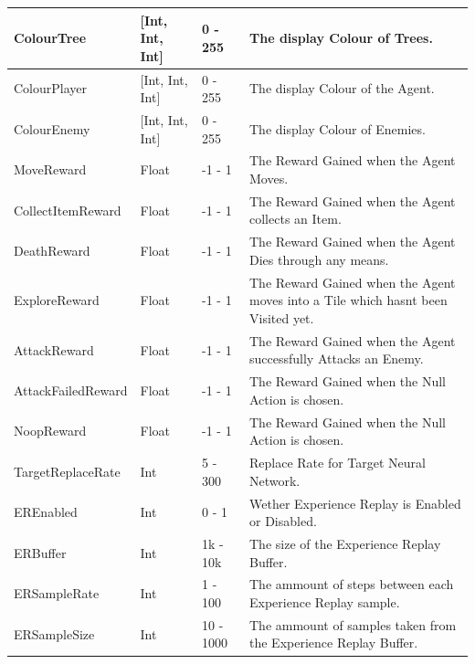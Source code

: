 \begin{flushleft}
\begin{enumerate}
\begin{longtable}{| C{4cm} | C{2cm} | C{1.5cm} | C{8cm} |}
                    \hline
                    ColourTree & [Int, Int, Int] & 0 - 255 & The display Colour of Trees. \\
                    \hline
                    ColourPlayer & [Int, Int, Int] & 0 - 255 & The display Colour of the Agent. \\
                    \hline
                    ColourEnemy & [Int, Int, Int] & 0 - 255 & The display Colour of Enemies. \\
                    \hline
                    MoveReward & Float & -1 - 1 & The Reward Gained when the Agent Moves. \\
                    \hline
                    CollectItemReward & Float & -1 - 1 & The Reward Gained when the Agent collects an Item. \\
                    \hline
                    DeathReward & Float & -1 - 1 & The Reward Gained when the Agent Dies through any means. \\
                    \hline
                    ExploreReward & Float & -1 - 1 & The Reward Gained when the Agent moves into a Tile which hasnt been Visited yet. \\
                    \hline
                    AttackReward & Float & -1 - 1 & The Reward Gained when the Agent successfully Attacks an Enemy. \\
                    \hline
                    AttackFailedReward & Float & -1 - 1 & The Reward Gained when the Null Action is chosen. \\
                    \hline
                    NoopReward & Float & -1 - 1 & The Reward Gained when the Null Action is chosen. \\
                    \hline
                    TargetReplaceRate & Int & 5 - 300 & Replace Rate for Target Neural Network. \\
                    \hline
                    EREnabled & Int & 0 - 1 & Wether Experience Replay is Enabled or Disabled. \\
                    \hline
                    ERBuffer & Int & 1k - 10k & The size of the Experience Replay Buffer. \\
                    \hline
                    ERSampleRate & Int & 1 - 100 & The ammount of steps between each Experience Replay sample. \\
                    \hline
                    ERSampleSize & Int & 10 - 1000 & The ammount of samples taken from the Experience Replay Buffer. \\

\end{longtable}
\end{enumerate}
\end{flushleft}
